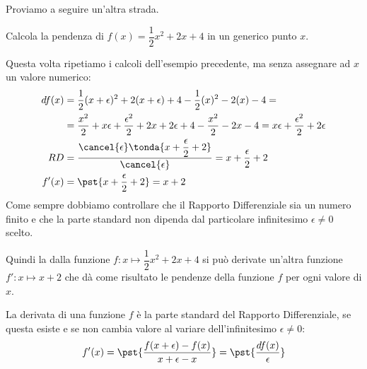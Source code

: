 Proviamo a seguire un'altra strada.
\begin{esempio}
Calcola la pendenza di \(f(x)=\dfrac{1}{2}x^2+2x+4\) in un generico 
punto \(x\).

Questa volta ripetiamo i calcoli dell'esempio precedente, ma senza assegnare 
ad \(x\) un valore numerico:
\begin{align*}
df(x) &= \dfrac{1}{2}(x+\epsilon)^2+2(x +\epsilon)+4 - 
              \dfrac{1}{2}(x)^2-2(x)-4 = \\
&= \dfrac{x^2}{2}+x\epsilon+\dfrac{\epsilon^2}{2} +
               2x+2\epsilon+4 - \dfrac{x^2}{2}-2x-4 = 
   x\epsilon+\dfrac{\epsilon^2}{2}+2\epsilon \\
RD &= \dfrac{\cancel{\epsilon} \tonda{x+\dfrac{\epsilon}{2}+2}}
            {\cancel{\epsilon}} = x+\dfrac{\epsilon}{2}+2\\
f'(x) &= \pst{x+\dfrac{\epsilon}{2}+2} = x +2
\end{align*}
Come sempre dobbiamo controllare che il Rapporto Differenziale sia 
un numero finito e che la parte standard non dipenda dal particolare 
infinitesimo \(\epsilon \ne 0\) scelto.
\end{esempio}

Quindi la dalla funzione \(f: x \mapsto \dfrac{1}{2}x^2+2x+4\) 
si può derivate un'altra funzione \(f': x \mapsto x +2\) che dà come 
risultato le pendenze della funzione \(f\) per ogni valore di \(x\). 

\begin{definizione}
La derivata di una funzione \(f\) è la parte standard del Rapporto 
Differenziale, se questa esiste e se non cambia valore al variare 
dell'infinitesimo \(\epsilon \neq 0\):
\[f'(x) = \pst{\dfrac{f(x +\epsilon) -f(x)}{x +\epsilon -x}}=
  \pst{\frac{df(x)}{\epsilon}}\]
\end{definizione}

